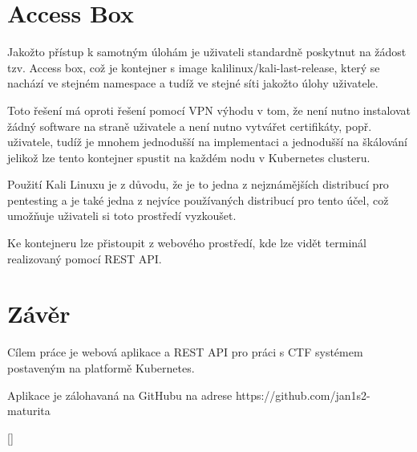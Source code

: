 \documentclass[12pt, a4paper,
twoside,        %
openright
]{report}
\begin{document}
\chapter{Access Box}
Jakožto přístup k samotným úlohám je uživateli standardně poskytnut na žádost tzv. Access box, což je kontejner s image kalilinux/kali-last-release, který se nachází ve stejném namespace a tudíž ve stejné síti jakožto úlohy uživatele. 

Toto řešení má oproti řešení pomocí VPN výhodu v tom, že není nutno instalovat žádný software na straně uživatele a není nutno vytvářet certifikáty, popř. uživatele, tudíž je mnohem jednodušší na implementaci a jednodušší na škálování jelikož lze tento kontejner spustit na každém nodu v Kubernetes clusteru.

Použití Kali Linuxu je z důvodu, že je to jedna z nejznámějších distribucí pro pentesting a je také jedna z nejvíce používaných distribucí pro tento účel, což umožňuje uživateli si toto prostředí vyzkoušet.

Ke kontejneru lze přistoupit z webového prostředí, kde lze vidět terminál realizovaný pomocí REST API.

	\chapter*{Závěr}

	Cílem práce je webová aplikace a REST API pro práci s CTF systémem postaveným na platformě Kubernetes.

	Aplikace je zálohavaná na GitHubu na adrese https://github.com/jan1s2-maturita
	

	
	
	
	
	\appendix %
	
	[\vspace{-22pt}] %
	
	
	
	
\end{document}
